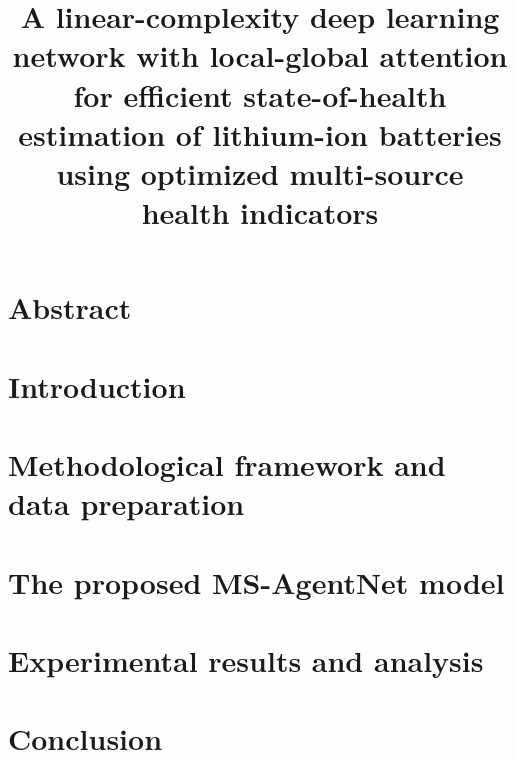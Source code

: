 \documentclass[UTF8,11pt]{ctexart}
\title{A linear-complexity deep learning network with local-global attention for efficient state-of-health estimation of lithium-ion batteries using optimized multi-source health indicators}
\author{}
\date{}
\begin{document}
\maketitle
\section*{Abstract}

\section{Introduction}


\FloatBarrier
\section{Methodological framework and data preparation}

\FloatBarrier
\section{The proposed MS-AgentNet model}

\FloatBarrier
\section{Experimental results and analysis}

\FloatBarrier
\section{Conclusion}

\FloatBarrier

\end{document}
